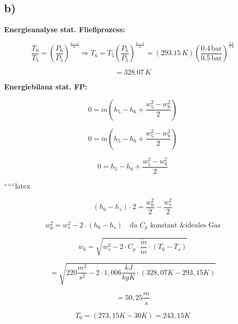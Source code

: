 

\subsection*{b)}

\textbf{Energieanalyse stat. Fließprozess:}

\[
\frac{T_6}{T_5} = \left( \frac{P_6}{P_5} \right)^{\frac{n-1}{n}} \Rightarrow T_6 = T_5 \left( \frac{P_6}{P_5} \right)^{\frac{n-1}{n}} = (293.15 \, K) \left( \frac{0.4 \, \text{bar}}{0.5 \, \text{bar}} \right)^{\frac{1.4}{1.4}}
\]

\[
= 328.07 \, K
\]

\textbf{Energiebilanz stat. FP:}

\[
0 = \dot{m} \left( h_5 - h_6 + \frac{w_5^2 - w_6^2}{2} \right)
\]

\[
0 = \dot{m} \left( h_5 - h_6 + \frac{w_5^2 - w_6^2}{2} \right)
\]

\[
0 = h_5 - h_6 + \frac{w_5^2 - w_6^2}{2}
\]

``````latex


\begin{equation*}
(h_6 - h_s) \cdot 2 = \frac{w_6^2}{2} - \frac{w_s^2}{2}
\end{equation*}

\begin{equation*}
w_6^2 = w_s^2 - 2 \cdot (h_6 - h_s) \quad \text{da } C_p \text{ konstant \& ideales Gas}
\end{equation*}

\begin{equation*}
w_6 = \sqrt{w_s^2 - 2 \cdot C_p \cdot \frac{\dot{m}}{\dot{m}} \cdot (T_6 - T_s)}
\end{equation*}

\begin{equation*}
= \sqrt{220 \frac{m^2}{s^2} - 2 \cdot 1,006 \frac{kJ}{kgK} \cdot (328,07K - 293,15K)}
\end{equation*}

\begin{equation*}
= 50,25 \frac{m}{s}
\end{equation*}

\begin{equation*}
T_0 = (273,15K - 30K) = 243,15K
\end{equation*}